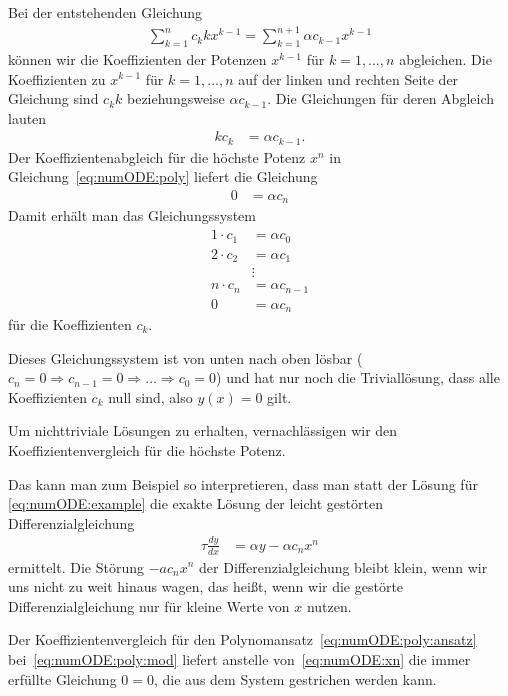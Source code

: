 \documentclass{article}
\def\ddx#1{\frac{d#1}{dx}}
\begin{document}
Bei der entstehenden Gleichung
\begin{align}
  \sum_{k = 1}^{n} c_k k x^{k-1} = \sum_{k=1}^{n+1}  \alpha c_{k-1} x^{k-1}
  \label{eq:numODE:poly}
\end{align}
können wir die Koeffizienten der Potenzen $x^{k-1}$ für $k=1,\ldots,n$
abgleichen. Die Koeffizienten zu $x^{k-1}$ für $k=1,\ldots,n$ auf der
linken und rechten Seite der Gleichung sind $c_k k$ beziehungsweise
$\alpha c_{k-1}$. Die Gleichungen für deren Abgleich lauten
\begin{align*}
  k c_{k} &= \alpha c_{k-1}.
\end{align*}
Der Koeffizientenabgleich für die höchste Potenz $x^n$ in
Gleichung~\eqref{eq:numODE:poly} liefert die Gleichung
\begin{align*}
  0 &= \alpha c_n
\end{align*}
Damit erhält man das Gleichungssystem
\begin{align}
  1\cdot c_1 &= \alpha c_0\label{eq:numODE:x0}\\
  2\cdot c_2 &= \alpha c_1\\
             &\vdots\\
  n\cdot c_{n} &= \alpha c_{n-1}\label{eq:numODE:xn1}\\
  0 &= \alpha c_n\label{eq:numODE:xn}
\end{align}
für die Koeffizienten $c_k$.

Dieses Gleichungssystem ist von unten nach oben lösbar
($c_n=0 \Rightarrow c_{n-1}=0 \Rightarrow \ldots\Rightarrow c_0 = 0$)
und hat nur noch die Triviallösung, dass alle Koeffizienten $c_k$ null
sind, also $y(x)=0$ gilt.

Um nichttriviale Lösungen zu erhalten, vernachlässigen wir den
Koeffizientenvergleich für die höchste Potenz.

Das kann man zum Beispiel so interpretieren, dass man statt der Lösung
für \eqref{eq:numODE:example} die exakte Lösung der leicht gestörten
Differenzialgleichung
\begin{align}
  \tau \ddx y &= \alpha y - \alpha c_n x^n
                \label{eq:numODE:poly:mod}
\end{align}
ermittelt. Die Störung $-ac_nx^n$ der Differenzialgleichung bleibt klein, wenn
wir uns nicht zu weit hinaus wagen, das heißt, wenn wir die gestörte
Differenzialgleichung nur für kleine Werte von $x$ nutzen.

Der Koeffizientenvergleich für den
Polynomansatz~\eqref{eq:numODE:poly:ansatz} bei~\eqref{eq:numODE:poly:mod}
liefert anstelle von~\eqref{eq:numODE:xn} die immer erfüllte Gleichung
$0=0$, die aus dem System gestrichen werden kann.
\end{document}
